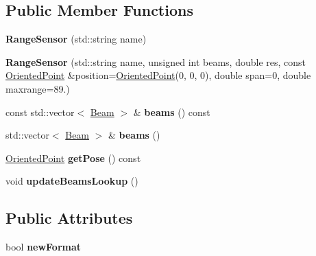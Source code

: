 \subsection*{Public Member Functions}
\begin{DoxyCompactItemize}
\item 
\mbox{\label{classGMapping_1_1RangeSensor_a759acaf8e43b5ede4225c223e372e123}} 
{\bfseries Range\+Sensor} (std\+::string name)
\item 
\mbox{\label{classGMapping_1_1RangeSensor_adbc852d4b503d035e7426cbdc74be79d}} 
{\bfseries Range\+Sensor} (std\+::string name, unsigned int beams, double res, const \hyperlink{structGMapping_1_1orientedpoint}{Oriented\+Point} \&position=\hyperlink{structGMapping_1_1orientedpoint}{Oriented\+Point}(0, 0, 0), double span=0, double maxrange=89.)
\item 
\mbox{\label{classGMapping_1_1RangeSensor_ae2b39d612082cc7e5de756baeaaac8e2}} 
const std\+::vector$<$ \hyperlink{structGMapping_1_1RangeSensor_1_1Beam}{Beam} $>$ \& {\bfseries beams} () const
\item 
\mbox{\label{classGMapping_1_1RangeSensor_ac9b8ba055316c0f3e11a3a3e5ae9c488}} 
std\+::vector$<$ \hyperlink{structGMapping_1_1RangeSensor_1_1Beam}{Beam} $>$ \& {\bfseries beams} ()
\item 
\mbox{\label{classGMapping_1_1RangeSensor_a9da0f1915d19b4b9d8837937567755f1}} 
\hyperlink{structGMapping_1_1orientedpoint}{Oriented\+Point} {\bfseries get\+Pose} () const
\item 
\mbox{\label{classGMapping_1_1RangeSensor_a5d4ca7fb976b6423cab5698a91d0384e}} 
void {\bfseries update\+Beams\+Lookup} ()
\end{DoxyCompactItemize}
\subsection*{Public Attributes}
\begin{DoxyCompactItemize}
\item 
\mbox{\label{classGMapping_1_1RangeSensor_abb35bace17df584710591ee0e737aa87}} 
bool {\bfseries new\+Format}
\end{DoxyCompactItemize}
